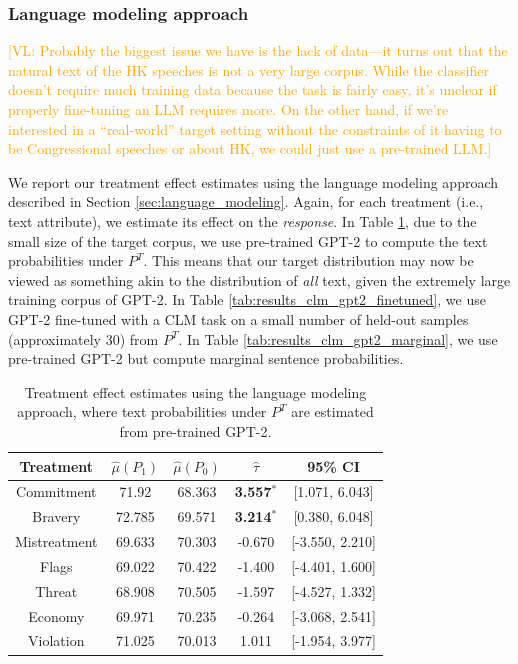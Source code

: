 \documentclass{article}
\newcommand{\vl}[1]{\textcolor{orange}{[VL: #1]}}
\begin{document}
\subsubsection{Language modeling approach}

\vl{Probably the biggest issue we have is the lack of data---it turns out that the natural text of the HK speeches is not a very large corpus. While the classifier doesn't require much training data because the task is fairly easy, it's unclear if properly fine-tuning an LLM requires more.
\newline
\newline
On the other hand, if we're interested in a ``real-world'' target setting without the constraints of it having to be Congressional speeches or about HK, we could just use a pre-trained LLM.}

We report our treatment effect estimates using the language modeling approach described in Section \ref{sec:language_modeling}. Again, for each treatment (i.e., text attribute), we estimate its effect on the \textit{response}. In Table \ref{tab:results_clm_gpt2}, due to the small size of the target corpus, we use pre-trained GPT-2 \cite{radford2019language} to compute the text probabilities under $P^T$. This means that our target distribution may now be viewed as something akin to the distribution of \textit{all} text, given the extremely large training corpus of GPT-2. In Table \ref{tab:results_clm_gpt2_finetuned}, we use GPT-2 fine-tuned with a CLM task on a small number of held-out samples (approximately 30) from $P^T$. In Table \ref{tab:results_clm_gpt2_marginal}, we use pre-trained GPT-2 but compute marginal sentence probabilities.

\begin{table}[!ht]
    \centering
    \begin{tabular}{c|cccc}
        \toprule
        Treatment & $\hat{\mu}(P_1)$ & $\hat{\mu}(P_0)$ & $\hat{\tau}$ & 95\% CI \\
        \midrule
        Commitment & 71.92 & 68.363 & \textbf{\textcolor{green!50!black}{3.557$^*$}} & [1.071, 6.043] \\
        Bravery & 72.785 & 69.571 & \textbf{\textcolor{green!50!black}{3.214$^*$}} & [0.380, 6.048]  \\
        Mistreatment & 69.633 & 70.303 & \textcolor{red!80!black}{-0.670} & [-3.550, 2.210] \\
        Flags & 69.022 & 70.422 & \textcolor{red!80!black}{-1.400} & [-4.401, 1.600] \\
        Threat & 68.908 & 70.505 & \textcolor{red!80!black}{-1.597} & [-4.527, 1.332] \\
        Economy & 69.971 & 70.235 & \textcolor{red!80!black}{-0.264} & [-3.068, 2.541] \\
        Violation & 71.025 & 70.013 & \textcolor{green!50!black}{1.011} & [-1.954, 3.977] \\
        \bottomrule
    \end{tabular}
    \caption{Treatment effect estimates using the language modeling approach, where text probabilities under $P^T$ are estimated from pre-trained GPT-2.}
    \label{tab:results_clm_gpt2}
\end{table}
\end{document}
